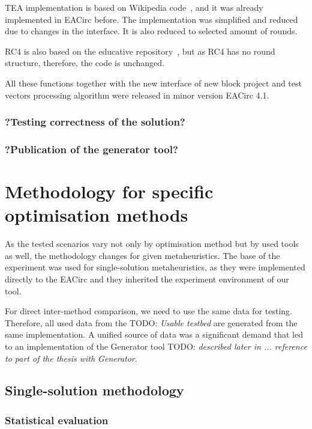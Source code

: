 \documentclass[
  print, %
  Table,   %
  nolof,     %
  nolot,     %
  11pt, %
  oneside  %
]{fithesis3}
\newcommand{\todo}[1]{TODO: \textit{#1}}
\begin{document}
TEA implementation is based on Wikipedia code~\cite{teaWiki}, and it was already implemented in EACirc before. The implementation was simplified and reduced due to changes in the interface. It is also reduced to selected amount of rounds.

RC4 is also based on the educative repository~\cite{cryptoFunc}, but as RC4 has no round structure, therefore, the code is unchanged.

All these functions together with the new interface of new block project and test vectors processing algorithm were released in minor version EACirc 4.1.

\subsubsection{?Testing correctness of the solution?}
\subsubsection{?Publication of the generator tool?}


\section{Methodology for specific optimisation methods}
\label{sec:method-spec}

As the tested scenarios vary not only by optimisation method but by used tools as well, the methodology changes for given metaheuristics. The base of the experiment was used for single-solution metaheuristics, as they were implemented directly to the EACirc and they inherited the experiment environment of our tool.

For direct inter-method comparison, we need to use the same data for testing. Therefore, all used data from the \todo{Usable testbed} are generated from the same implementation. A unified source of data was a significant demand that led to an implementation of the Generator tool \todo{described later in ... reference to part of the thesis with Generator}.

\subsection{Single-solution methodology}
\label{subsec:method-spec-ss}

\subsubsection{Statistical evaluation}
\label{subsubsec:method-spec-ss-stat}
\end{document}
